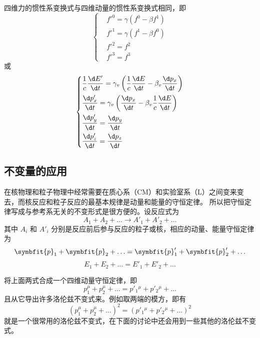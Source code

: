 四维力的惯性系变换式与四维动量的惯性系变换式相同，即
\begin{equation}
    \left\{
    \begin{aligned}
         & f'^0 = \gamma (f^0 - \beta f^1) \\
         & f'^1 = \gamma (f^1 - \beta f^0) \\
         & f'^2 = f^2                      \\
         & f'^3 = f^3
    \end{aligned}
    \right.
\end{equation}
或
\begin{equation}
    \left\{
    \begin{aligned}
         & \frac{1}{c} \frac{\d E'}{\d t} = \gamma_v \left( \frac{1}{c} \frac{\d E}{\d t} - \beta_v \frac{\d p_x}{\d t} \right) \\
         & \frac{\d p_x'}{\d t} = \gamma_v \left( \frac{\d p_x}{\d t} - \beta_v \frac{1}{c} \frac{\d E}{\d t} \right)           \\
         & \frac{\d p_y'}{\d t} = \frac{\d p_y}{\d t}                                                                           \\
         & \frac{\d p_z'}{\d t} = \frac{\d p_z}{\d t}
    \end{aligned}
    \right.
\end{equation}

\subsection{不变量的应用}

在核物理和粒子物理中经常需要在质心系（CM）和实验室系（L）之间变来变去，而核反应和粒子反应的最基本规律是动量和能量的守恒定律。
所以把守恒定律写成与参考系无关的不变形式是很方便的。设反应式为
\begin{equation}
    A_1 + A_2 + \ldots \to A'_1 + A'_2 + \ldots
\end{equation}
其中 $A_i$ 和 $A'_i$ 分别是反应前后参与反应的粒子或核，相应的动量、能量守恒定律为
\begin{equation}
    \symbfit{p}_1 + \symbfit{p}_2 + \ldots = \symbfit{p}'_1 + \symbfit{p}'_2 + \ldots
\end{equation}
\begin{equation}
    E_1 + E_2 + \ldots = E'_1 + E'_2 + \ldots
\end{equation}

将上面两式合成一个四维动量守恒定律，即
\begin{equation}
    p_1^\mu + p_2^\mu + \ldots = p'_1{}^\mu + p'_2{}^\mu + \ldots
\end{equation}
且从它导出许多洛伦兹不变式来。例如取两端的模方，即有
\begin{equation}
    (p_1^\mu + p_2^\mu + \ldots)^2 = (p'_1{}^\mu + p'_2{}^\mu + \ldots)^2
\end{equation}
就是一个很常用的洛伦兹不变式，在下面的讨论中还会用到一些其他的洛伦兹不变式。

